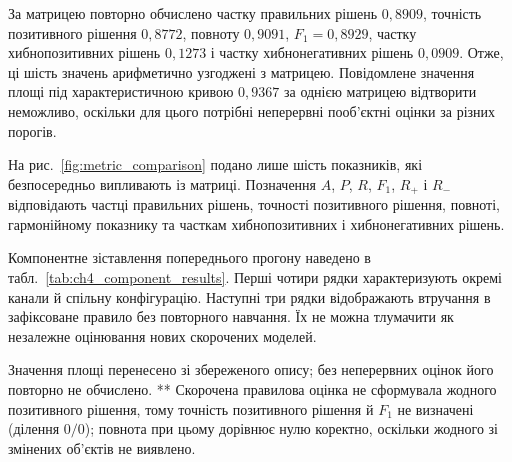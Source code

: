За матрицею повторно обчислено частку правильних рішень $0{,}8909$, точність позитивного рішення $0{,}8772$, повноту $0{,}9091$, $F_1=0{,}8929$, частку хибнопозитивних рішень $0{,}1273$ і частку хибнонегативних рішень $0{,}0909$. Отже, ці шість значень арифметично узгоджені з матрицею. Повідомлене значення площі під характеристичною кривою $0{,}9367$ за однією матрицею відтворити неможливо, оскільки для цього потрібні неперервні пооб’єктні оцінки за різних порогів.

На рис.~\ref{fig:metric_comparison} подано лише шість показників, які безпосередньо випливають із матриці. Позначення $A$, $P$, $R$, $F_1$, $R_{+}$ і $R_{-}$ відповідають частці правильних рішень, точності позитивного рішення, повноті, гармонійному показнику та часткам хибнопозитивних і хибнонегативних рішень.



Компонентне зіставлення попереднього прогону наведено в табл.~\ref{tab:ch4_component_results}. Перші чотири рядки характеризують окремі канали й спільну конфігурацію. Наступні три рядки відображають втручання в зафіксоване правило без повторного навчання. Їх не можна тлумачити як незалежне оцінювання нових скорочених моделей.

\begin{table}[htbp]
\caption{Агреговані результати окремих каналів і компонентного вилучення}
\label{tab:ch4_component_results}
\centering
\scriptsize
{}

\vspace{2pt}
\parbox{0.96\textwidth}{\footnotesize * Значення площі перенесено зі збереженого опису; без неперервних оцінок його повторно не обчислено. ** Скорочена правилова оцінка не сформувала жодного позитивного рішення, тому точність позитивного рішення й $F_1$ не визначені (ділення $0/0$); повнота при цьому дорівнює нулю коректно, оскільки жодного зі змінених об’єктів не виявлено.}
\end{table}

